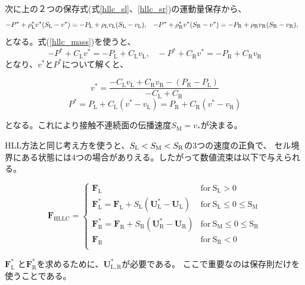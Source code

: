 次に上の２つの保存式(式\ref{hllc_sl}、\ref{hllc_sr})の運動量保存から、
\begin{equation}
   - P^* + \rho_\mathrm{L}^* v^* (S_\mathrm{L} - v^*) = 
   - P_\mathrm{L} + \rho_\mathrm{L} v_\mathrm{L}(S_\mathrm{L} - v_\mathrm{L}),\;\;\;
   - P^* + \rho_\mathrm{R}^* v^* (S_\mathrm{R} - v^*) = 
   - P_\mathrm{R} + \rho_\mathrm{R} v_\mathrm{R}(S_\mathrm{R} - v_\mathrm{R}),\;\;\;
 \label{hllc_mom}
\end{equation}
となる。式(\ref{hllc_mass})を使うと、
\begin{equation}
   - P^* + C_\mathrm{L} v^* = 
   - P_\mathrm{L} + C_\mathrm{L} v_\mathrm{L},\;\;\;
   - P^* + C_\mathrm{R} v^* = 
   - P_\mathrm{R} + C_\mathrm{R} v_\mathrm{R}
 \label{hllc_mom}
\end{equation}
となり、$v^*$と$P^*$について解くと、
\begin{screen}
\begin{equation}
    v^* = \frac{ - C_\mathrm{L} v_\mathrm{L} + C_\mathrm{R} v_\mathrm{R} - (P_\mathrm{R} - P_\mathrm{L})}{-C_\mathrm{L} + C_\mathrm{R}} 
\end{equation}
\begin{equation}
    P^* = P_\mathrm{L} + C_\mathrm{L} (v^* - v_\mathrm{L})
        = P_\mathrm{R} + C_\mathrm{R} (v^* - v_\mathrm{R})
\end{equation}
\end{screen}
となる。これにより接触不連続面の伝播速度$S_\mathrm{M}=v_*$が決まる。

HLL方法と同じ考え方を使うと、$S_\mathrm{L}< S_\mathrm{M}<S_\mathrm{R}$の3つの速度の正負で、
セル境界にある状態には4つの場合がありえる。したがって数値流束は以下で与えられる。
\begin{screen}
\begin{equation}
      \bm{ F}_\mathrm{HLLC} = \left\{
          \begin{array}{ll}
             \bm{ F}_\mathrm{L} & \mathrm{for~S_\mathrm{L}>0}\\
             \bm{ F}_\mathrm{L}^* = \bm{ F}_\mathrm{L} + S_\mathrm{L}\left( \bm{ U}_\mathrm{L}^* - \bm{ U}_\mathrm{L} \right)& \mathrm{for~S_\mathrm{L}\le 0 \le S_\mathrm{M}}\\
             \bm{ F}_\mathrm{R}^* = \bm{ F}_\mathrm{R} + S_\mathrm{R}\left( \bm{ U}_\mathrm{R}^* - \bm{ U}_\mathrm{R} \right)& \mathrm{for~S_\mathrm{M}\le 0 \le S_\mathrm{R}}\\
             \bm{ F}_\mathrm{R} & \mathrm{for~S_\mathrm{R}<0}\\
          \end{array}
      \right.
\end{equation}
\end{screen}
$\bm{ F}_\mathrm{L}^*$
と$\bm{ F}_\mathrm{R}^*$を求めるために、$\bm{ U}_\mathrm{L,R}^*$が必要である。
ここで重要なのは保存則だけを使うことである。

